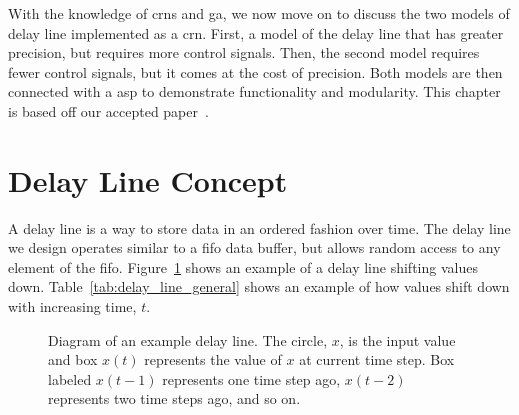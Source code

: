 
With the knowledge of \glspl{crn} and \gls{ga}, we now move on to discuss the two models of delay line implemented as a \gls{crn}. First, a model of the delay line that has greater precision, but requires more control signals. Then, the second model requires fewer control signals, but it comes at the cost of precision. Both models are then connected with a \gls{asp} to demonstrate functionality and modularity. This chapter is based off our accepted paper~\cite{Moles2014-ia}.

\section{Delay Line Concept}

A delay line is a way to store data in an ordered fashion over time. The delay line we design operates similar to a \gls{fifo} data buffer, but allows random access to any element of the \gls{fifo}. Figure~\ref{fig:delay_line_general} shows an example of a delay line shifting values down. Table~\ref{tab:delay_line_general} shows an example of how values shift down with increasing time, $t$.

\begin{figure}
    \centering
    \caption[Delay Line]{Diagram of an example delay line. The circle, $x$, is the input value and box $x(t)$ represents the value of $x$ at current time step. Box labeled $x(t-1)$ represents one time step ago, $x(t-2)$ represents two time steps ago, and so on.}
    \label{fig:delay_line_general}
\end{figure}
    
